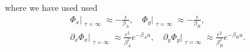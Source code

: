 \documentclass[aps,rmp,twocolumn,groupedaddress,floatfix,notitlepage]{revtex4-1}
\begin{document}
where we have used used
\begin{subequations}
    \begin{gather}
        \Phi_x \Big\vert_{\substack{\tau=\infty}} \approx - \frac{\epsilon}{\beta_A} 
        , \quad
        \Phi_y \Big\vert_{\substack{\tau=\infty}} \approx - \frac{\epsilon}{\beta_B} 
         , \\
        \partial_x \Phi_x \Big\vert_{\substack{\tau=\infty}} \approx \frac{\epsilon^2}{\beta_A^2}e^{-\beta_Au} %
        , \quad
        \partial_y \Phi_y \Big\vert_{\substack{\tau=\infty}} \approx \frac{\epsilon^2}{\beta_B^2}e^{-\beta_Bu} %
        .
    \end{gather}
\end{subequations}
\end{document}
